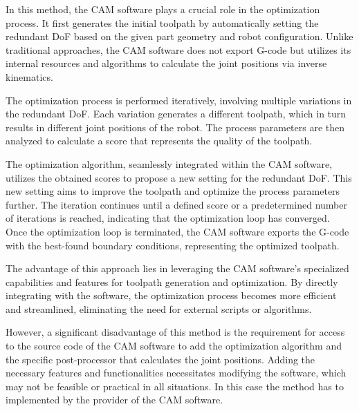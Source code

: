 In this method, the \acrshort{CAM} software plays a crucial role in the optimization process. It first generates the initial toolpath by automatically setting the redundant \acrshort{DoF} based on the given part geometry and robot configuration. Unlike traditional approaches, the \acrshort{CAM} software does not export G-code but utilizes its internal resources and algorithms to calculate the joint positions via inverse kinematics.

The optimization process is performed iteratively, involving multiple variations in the redundant \acrshort{DoF}. Each variation generates a different toolpath, which in turn results in different joint positions of the robot. The process parameters are then analyzed to calculate a score that represents the quality of the toolpath.

The optimization algorithm, seamlessly integrated within the \acrshort{CAM} software, utilizes the obtained scores to propose a new setting for the redundant \acrshort{DoF}. This new setting aims to improve the toolpath and optimize the process parameters further. The iteration continues until a defined score or a predetermined number of iterations is reached, indicating that the optimization loop has converged.
Once the optimization loop is terminated, the \acrshort{CAM} software exports the G-code with the best-found boundary conditions, representing the optimized toolpath.

The advantage of this approach lies in leveraging the \acrshort{CAM} software's specialized capabilities and features for toolpath generation and optimization. By directly integrating with the software, the optimization process becomes more efficient and streamlined, eliminating the need for external scripts or algorithms.

However, a significant disadvantage of this method is the requirement for access to the source code of the \acrshort{CAM} software to add the optimization algorithm and the specific post-processor that calculates the joint positions. Adding the necessary features and functionalities necessitates modifying the software, which may not be feasible or practical in all situations. In this case the method has to implemented by the provider of the \acrshort{CAM} software.